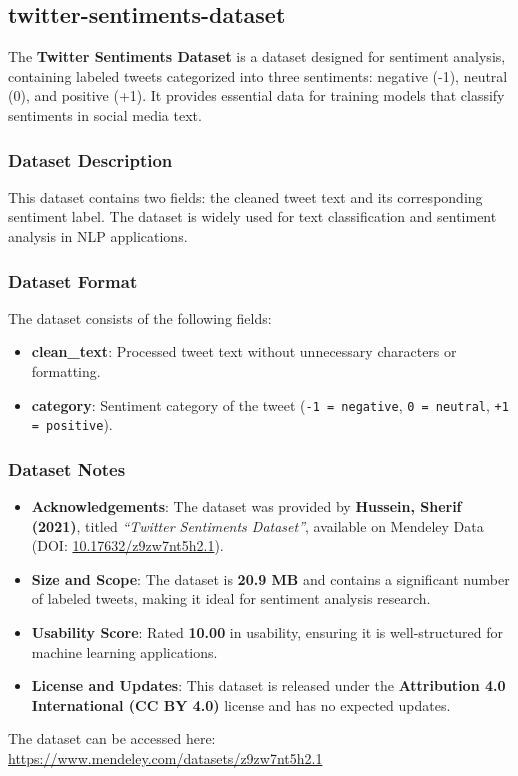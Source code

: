 \subsection{twitter-sentiments-dataset}

The \textbf{Twitter Sentiments Dataset} is a dataset designed for sentiment analysis, containing labeled tweets categorized into three sentiments: negative (-1), neutral (0), and positive (+1). It provides essential data for training models that classify sentiments in social media text.

\subsubsection{Dataset Description}

This dataset contains two fields: the cleaned tweet text and its corresponding sentiment label. The dataset is widely used for text classification and sentiment analysis in NLP applications.

\subsubsection{Dataset Format}

The dataset consists of the following fields:

\begin{itemize}
    \item \textbf{clean\_text}: Processed tweet text without unnecessary characters or formatting.
    \item \textbf{category}: Sentiment category of the tweet (\texttt{-1 = negative}, \texttt{0 = neutral}, \texttt{+1 = positive}).
\end{itemize}

\subsubsection{Dataset Notes}

\begin{itemize}
    \item \textbf{Acknowledgements}: The dataset was provided by \textbf{Hussein, Sherif (2021)}, titled \textit{“Twitter Sentiments Dataset”}, available on Mendeley Data (DOI: \url{10.17632/z9zw7nt5h2.1}).
    \item \textbf{Size and Scope}: The dataset is \textbf{20.9 MB} and contains a significant number of labeled tweets, making it ideal for sentiment analysis research.
    \item \textbf{Usability Score}: Rated \textbf{10.00} in usability, ensuring it is well-structured for machine learning applications.
    \item \textbf{License and Updates}: This dataset is released under the \textbf{Attribution 4.0 International (CC BY 4.0)} license and has no expected updates.
\end{itemize}

The dataset can be accessed here: \url{https://www.mendeley.com/datasets/z9zw7nt5h2.1}

\newpage

